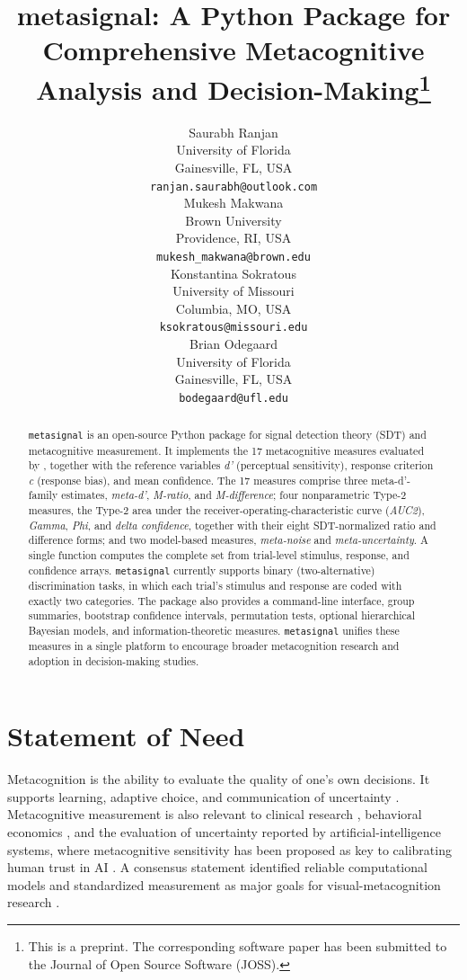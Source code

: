 \documentclass{article}
\title{metasignal: A Python Package for Comprehensive Metacognitive Analysis and Decision-Making\thanks{This is a preprint. The corresponding software paper has been submitted to the Journal of Open Source Software (JOSS).}}
\author{
 Saurabh Ranjan \\
  University of Florida\\
  Gainesville, FL, USA \\
  \texttt{ranjan.saurabh@outlook.com} \\
  \And
 Mukesh Makwana \\
  Brown University\\
  Providence, RI, USA \\
  \texttt{mukesh\_makwana@brown.edu} \\
  \And
 Konstantina Sokratous \\
  University of Missouri\\
  Columbia, MO, USA \\
  \texttt{ksokratous@missouri.edu} \\
  \And
 Brian Odegaard \\
  University of Florida\\
  Gainesville, FL, USA \\
  \texttt{bodegaard@ufl.edu} \\
}
\begin{document}
\maketitle

\begin{abstract}
\texttt{metasignal} is an open-source Python package for signal detection theory (SDT) and metacognitive measurement. It implements the 17 metacognitive measures evaluated by \citet{rahnev2025}, together with the reference variables \emph{d'} (perceptual sensitivity), response criterion \emph{c} (response bias), and mean confidence. The 17 measures comprise three meta-d'-family estimates, \emph{meta-d'}, \emph{M-ratio}, and \emph{M-difference}; four nonparametric Type-2 measures, the Type-2 area under the receiver-operating-characteristic curve (\emph{AUC2}), \emph{Gamma}, \emph{Phi}, and \emph{delta confidence}, together with their eight SDT-normalized ratio and difference forms; and two model-based measures, \emph{meta-noise} and \emph{meta-uncertainty}. A single function computes the complete set from trial-level stimulus, response, and confidence arrays. \texttt{metasignal} currently supports binary (two-alternative) discrimination tasks, in which each trial's stimulus and response are coded with exactly two categories. The package also provides a command-line interface, group summaries, bootstrap confidence intervals, permutation tests, optional hierarchical Bayesian models, and information-theoretic measures. \texttt{metasignal} unifies these measures in a single platform to encourage broader metacognition research and adoption in decision-making studies.
\end{abstract}


\section{Statement of Need}\label{statement-of-need}

Metacognition is the ability to evaluate the quality of one's own decisions. It supports learning, adaptive choice, and communication of uncertainty \citep{flemingdolan2012, yeungsummerfield2012}. Metacognitive measurement is also relevant to clinical research \citep{hoven2019}, behavioral economics \citep{moorehealy2008}, and the evaluation of uncertainty reported by artificial-intelligence systems, where metacognitive sensitivity has been proposed as key to calibrating human trust in AI \citep{steyvers2025, griot2025, lee2025trust}. A consensus statement identified reliable computational models and standardized measurement as major goals for visual-metacognition research \citep{rahnev2022}.
\end{document}
